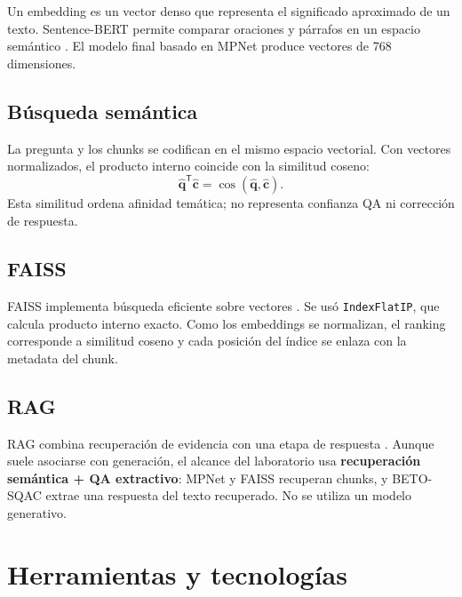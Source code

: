 \documentclass[12pt,letterpaper]{article}
\begin{document}
Un embedding es un vector denso que representa el significado aproximado de un
texto. Sentence-BERT permite comparar oraciones y párrafos en un espacio
semántico \cite{reimers2019}. El modelo final basado en MPNet
\cite{song2020} produce vectores de 768 dimensiones.

\subsection{Búsqueda semántica}

La pregunta y los chunks se codifican en el mismo espacio vectorial. Con
vectores normalizados, el producto interno coincide con la similitud coseno:
\[
  \widehat{\mathbf q}^{\mathsf T}\widehat{\mathbf c}
  =\cos(\widehat{\mathbf q},\widehat{\mathbf c}).
\]
Esta similitud ordena afinidad temática; no representa confianza QA ni
corrección de respuesta.

\subsection{FAISS}

FAISS implementa búsqueda eficiente sobre vectores \cite{johnson2019}. Se usó
\texttt{IndexFlatIP}, que calcula producto interno exacto. Como los embeddings
se normalizan, el ranking corresponde a similitud coseno y cada posición del
índice se enlaza con la metadata del chunk.

\subsection{RAG}

RAG combina recuperación de evidencia con una etapa de respuesta
\cite{lewis2020}. Aunque suele asociarse con generación, el alcance del
laboratorio usa \textbf{recuperación semántica + QA extractivo}: MPNet y FAISS
recuperan chunks, y BETO-SQAC extrae una respuesta del texto recuperado. No se
utiliza un modelo generativo.

\section{Herramientas y tecnologías}
\end{document}
